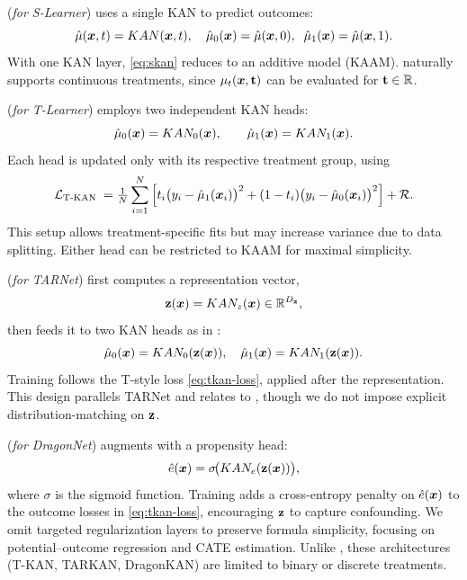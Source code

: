 \textbf{\skan} (\emph{\our for S-Learner}) uses a single KAN to predict outcomes:
\begin{equation}
\label{eq:skan}
\hat{\mu}({\bm{x}},t)=KAN({\bm{x}},t),\quad
\hat{\mu}_0({\bm{x}})=\hat{\mu}({\bm{x}},0),\;\;\hat{\mu}_1({\bm{x}})=\hat{\mu}({\bm{x}},1).
\end{equation}
With one KAN layer, \cref{eq:skan} reduces to an additive model (KAAM). \skan naturally supports continuous treatments, since $\mu_t({\bm{x}},{\mathbf{t}})$ can be evaluated for ${\mathbf{t}} \in \mathbb{R}$.

\textbf{\tkan} (\emph{\our for T-Learner}) employs two independent KAN heads:
\begin{equation}
\label{eq:tkan}
\hat{\mu}_0({\bm{x}})=KAN_0({\bm{x}}),\qquad \hat{\mu}_1({\bm{x}})=KAN_1({\bm{x}}).
\end{equation}
Each head is updated only with its respective treatment group, using
\begin{equation}
\label{eq:tkan-loss}
\mathcal{L}_{\text{T-KAN }}=\tfrac{1}{N}\sum_{i=1}^{N}\Big[t_i\big(y_i-\hat{\mu}_1({\bm{x}}_i)\big)^2+(1-t_i)\big(y_i-\hat{\mu}_0({\bm{x}}_i)\big)^2\Big]+\mathcal{R}.
\end{equation}
This setup allows treatment-specific fits but may increase variance due to data splitting. Either head can be restricted to KAAM for maximal simplicity.

\textbf{\tarkan} (\emph{\our for TARNet}) first computes a representation vector,
\begin{equation}
\label{eq:tarkan}
{\mathbf{z}}({\bm{x}})=KAN_z({\bm{x}})\in\mathbb{R}^{{{D}_{\mathbf{z}}}},
\end{equation}
then feeds it to two KAN heads as in \tkan:
\begin{equation}
\hat{\mu}_0({\bm{x}})=KAN_0({\mathbf{z}}({\bm{x}})),\quad
\hat{\mu}_1({\bm{x}})=KAN_1({\mathbf{z}}({\bm{x}})).
\end{equation}
Training follows the T-style loss \cref{eq:tkan-loss}, applied after the representation. This design parallels TARNet and relates to \citet{mehendale2025kanite}, though we do not impose explicit distribution-matching on ${\mathbf{z}}$.

\textbf{\dragonkan} (\emph{\our for DragonNet}) augments \tarkan with a propensity head:
\begin{equation}
\label{eq:dragonkan}
\hat{e}({\bm{x}})=\sigma\!\big(KAN_e({\mathbf{z}}({\bm{x}}))\big),
\end{equation}
where $\sigma$ is the sigmoid function. Training adds a cross-entropy penalty on $\hat{e}({\bm{x}})$ to the outcome losses in \cref{eq:tkan-loss}, encouraging ${\mathbf{z}}$ to capture confounding. We omit targeted regularization layers to preserve formula simplicity, focusing on potential–outcome regression and CATE estimation. Unlike \skan, these architectures (T-KAN, TARKAN, DragonKAN) are limited to binary or discrete treatments.
